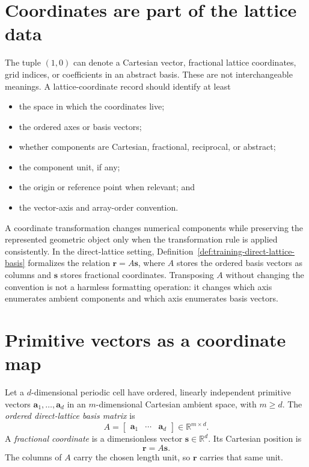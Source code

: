 \section{Coordinates are part of the lattice data}

The tuple \((1,0)\) can denote a Cartesian vector, fractional lattice
coordinates, grid indices, or coefficients in an abstract basis. These are not
interchangeable meanings. A lattice-coordinate record should identify at least

\begin{itemize}
  \item the space in which the coordinates live;
  \item the ordered axes or basis vectors;
  \item whether components are Cartesian, fractional, reciprocal, or abstract;
  \item the component unit, if any;
  \item the origin or reference point when relevant; and
  \item the vector-axis and array-order convention.
\end{itemize}

A coordinate transformation changes numerical components while preserving the
represented geometric object only when the transformation rule is applied
consistently. In the direct-lattice setting,
Definition~\ref{def:training-direct-lattice-basis} formalizes the relation
\(\mathbf r=A\mathbf s\), where \(A\) stores the ordered basis vectors as
columns and \(\mathbf s\) stores fractional coordinates. Transposing \(A\)
without changing the convention is not a harmless formatting operation: it
changes which axis enumerates ambient components and which axis enumerates basis
vectors.

\section{Primitive vectors as a coordinate map}

\begin{definition}
\label{def:training-direct-lattice-basis}
Let a $d$-dimensional periodic cell have ordered, linearly independent primitive
vectors $\mathbf a_1,\ldots,\mathbf a_d$ in an $m$-dimensional Cartesian ambient
space, with $m\geq d$. The \emph{ordered direct-lattice basis matrix} is
\begin{equation}
  A=
  \begin{bmatrix}
    \mathbf a_1 & \cdots & \mathbf a_d
  \end{bmatrix}
  \in\mathbb R^{m\times d}.
  \label{eq:training-direct-basis}
\end{equation}
A \emph{fractional coordinate} is a dimensionless vector
$\mathbf s\in\mathbb R^d$. Its Cartesian position is
\begin{equation}
  \mathbf r=A\mathbf s.
  \label{eq:training-fractional-to-cartesian}
\end{equation}
The columns of $A$ carry the chosen length unit, so $\mathbf r$ carries that
same unit.
\end{definition}

